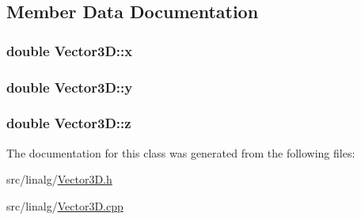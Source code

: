 \subsection{Member Data Documentation}
\subsubsection[{\texorpdfstring{x}{x}}]{\setlength{\rightskip}{0pt plus 5cm}double Vector3\+D\+::x\hspace{0.3cm}{\ttfamily [protected]}}\hypertarget{classVector3D_a3c086dfccfc57dd996e9b8600098a430}{}\label{classVector3D_a3c086dfccfc57dd996e9b8600098a430}
\subsubsection[{\texorpdfstring{y}{y}}]{\setlength{\rightskip}{0pt plus 5cm}double Vector3\+D\+::y\hspace{0.3cm}{\ttfamily [protected]}}\hypertarget{classVector3D_adcec384756103d26d1181e45d5a0fd78}{}\label{classVector3D_adcec384756103d26d1181e45d5a0fd78}
\subsubsection[{\texorpdfstring{z}{z}}]{\setlength{\rightskip}{0pt plus 5cm}double Vector3\+D\+::z\hspace{0.3cm}{\ttfamily [protected]}}\hypertarget{classVector3D_a7321f3ff785f275c4d83f7d1b951752a}{}\label{classVector3D_a7321f3ff785f275c4d83f7d1b951752a}


The documentation for this class was generated from the following files\+:\begin{DoxyCompactItemize}
\item 
src/linalg/\hyperlink{Vector3D_8h}{Vector3\+D.\+h}\item 
src/linalg/\hyperlink{Vector3D_8cpp}{Vector3\+D.\+cpp}\end{DoxyCompactItemize}
